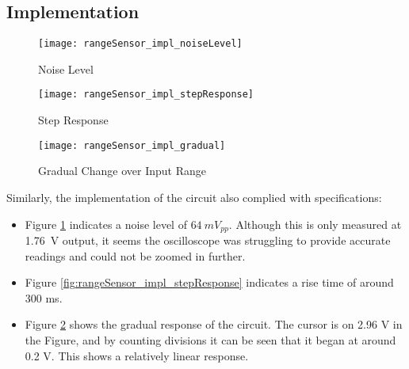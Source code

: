 \subsection{Implementation}

\begin{figure}[!htb]
    \centering
    \texttt{[image: rangeSensor\_impl\_noiseLevel]}
    \caption{Noise Level}
    \label{fig:rangeSensor_impl_noiseLevel}
\end{figure}

\begin{figure}[!htb]
    \centering
    \begin{minipage}{0.45\textwidth}
        \centering
        \texttt{[image: rangeSensor\_impl\_stepResponse]}
        \caption{Step Response}
        \label{fig:rangeSensor_impl_stepResponse}
    \end{minipage}
    \begin{minipage}{0.45\textwidth}
        \centering
        \texttt{[image: rangeSensor\_impl\_gradual]}
        \caption{Gradual Change over Input Range}
        \label{fig:rangeSensor_impl_gradual}
    \end{minipage}
\end{figure}

Similarly, the implementation of the circuit also complied with specifications:
\begin{itemize}
    \item Figure \ref{fig:rangeSensor_impl_noiseLevel} indicates a noise level of $\SI{64}{mV_{pp}}$. Although this is only measured at
          \SI{1.76}{V} output, it seems the oscilloscope was struggling to provide accurate readings and could not be zoomed in further.
    \item Figure \ref{fig:rangeSensor_impl_stepResponse} indicates a rise time of around 300 ms.
    \item Figure \ref{fig:rangeSensor_impl_gradual} shows the gradual response of the circuit. The cursor is on 2.96 V in the Figure, and
          by counting divisions it can be seen that it began at around 0.2 V. This shows a relatively linear response.
\end{itemize}